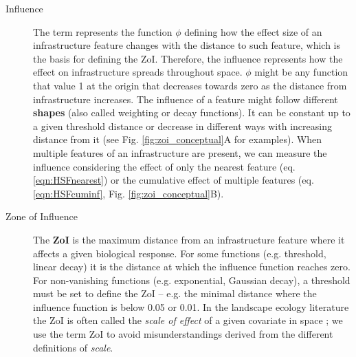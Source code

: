 \documentclass[titlepage]{article}
\begin{document}
\begin{tcolorbox}[width=1.3\textwidth,center,colback=yellow!5,colframe=yellow!75!black,title={Box 1 -- Definitions}]
\begin{description}
    \item[Influence] The term represents the function $\phi$ defining how the effect size of an infrastructure feature changes with the distance to such feature, which is the basis for defining the ZoI. Therefore, the influence represents how the effect on infrastructure spreads throughout space. $\phi$ might be any function that value 1 at the origin that decreases towards zero as the distance from infrastructure increases. The influence of a feature might follow different \textbf{shapes} (also called weighting or decay functions). It can be constant up to a given threshold distance or decrease in different ways with increasing distance from it (see Fig. \ref{fig:zoi_conceptual}A for examples). When multiple features of an infrastructure are present, we can measure the influence considering the effect of only the nearest feature (eq. \ref{eqn:HSFnearest}) or the cumulative effect of multiple features (eq. \ref{eqn:HSFcuminf}, Fig. \ref{fig:zoi_conceptual}B).
    
    \item[Zone of Influence] The \textbf{ZoI} is the maximum distance from an infrastructure feature where it affects a given biological response. For some functions (e.g. threshold, linear decay) it is the distance at which the influence function reaches zero. For non-vanishing functions (e.g. exponential, Gaussian decay), a threshold must be set to define the ZoI -- e.g. the minimal distance where the influence function is below 0.05 or 0.01. 
    In the landscape ecology literature the ZoI is often called the \textit{scale of effect} of a given covariate in space \citep[e.g.][]{jackson_are_2015}; we use the term ZoI to avoid misunderstandings derived from the different definitions of \textit{scale}. 
    

\end{description}
\end{tcolorbox}
\end{document}
